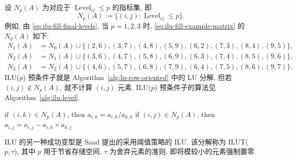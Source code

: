 {设 $N_p(A)$ 为对应于 $\operatorname{Level}_{ij}\le p$ 的指标集, 即}
\[N_p(A):=\{(i,j):\operatorname{Level}_{ij}\le p\}.\]
{例如, 由 \eqref{eq:ilu-fill-final-levels}, 当 $p=1,2,3$ 时, \eqref{eq:ilu-fill-example-matrix} 的 $N_p(A)$ 如下:}
\[\begin{aligned}
N_1(A)&=N_0(A)\cup\{(2,6),(3,7),(4,8),(5,9),(6,2),(7,3),(8,4),(9,5)\},\\
N_2(A)&=N_1(A)\cup\{(3,6),(4,7),(5,8),(6,9),(6,3),(7,4),(8,5),(9,6)\},\\
N_3(A)&=N_2(A)\cup\{(4,6),(5,7),(6,8),(7,9),(6,4),(7,5),(8,6),(9,7)\}.
\end{aligned}\]
{ILU($p$) 预条件子就是 Algorithm\ \ref{alg:lu-row-oriented} 中的 LU 分解, 但若 $(i,j)\notin N_p(A)$, 就不计算 $(i,j)$ 元素. ILU($p$) 预条件子的算法见 Algorithm\ \ref{alg:ilu-level}.}
\begin{algorithm}[H]\caption{{ILU($p$) 预条件子}}\label{alg:ilu-level}\begin{algorithmic}[1]
\State if $(i,k)\in N_p(A)$, then $a_{i,k}=a_{i,k}/a_{k,k}$
\State if $(i,j)\in N_p(A)$, then $a_{i,j}=a_{i,j}-a_{i,k}\times a_{k,j}$
\EndFor\EndFor\EndFor\end{algorithmic}\end{algorithm}
{ILU 的另一种成功变型是 Saad  提出的采用阈值策略的 ILU. 该分解称为 ILUT($p,\tau$), 其中 $p$ 用于节省存储空间, $\tau$ 为舍弃元素的准则, 即将模较小的元素强制置零.}
